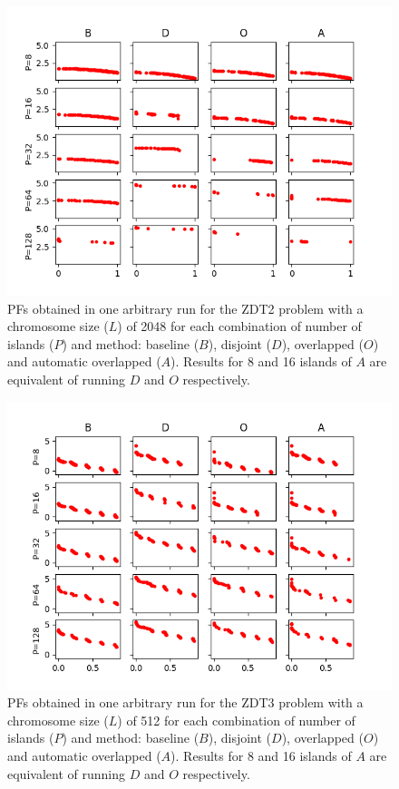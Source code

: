 \documentclass[preprint]{elsarticle}
\begin{document}
\begin{figure}
\centering
\includegraphics[width=12cm]{plot_zdt2_2048.png}
\caption{PFs obtained in one arbitrary run for the ZDT2 problem with a chromosome size ($L$) of 2048 for each combination of number of islands ($P$) and method: baseline ($B$), disjoint ($D$), overlapped ($O$) and automatic overlapped ($A$). Results for 8 and 16 islands of $A$ are equivalent of running $D$ and $O$ respectively. }
\label{fig:plot_zdt2_2048}
\end{figure}





\begin{figure}
\centering
\includegraphics[width=12cm]{plot_zdt3_512.png}
\caption{PFs obtained in one arbitrary run for the ZDT3 problem with a chromosome size ($L$) of 512 for each combination of number of islands ($P$) and method: baseline ($B$), disjoint ($D$), overlapped ($O$) and automatic overlapped ($A$). Results for 8 and 16 islands of $A$ are equivalent of running $D$ and $O$ respectively. }
\label{fig:plot_zdt3_512}
\end{figure}
\end{document}
